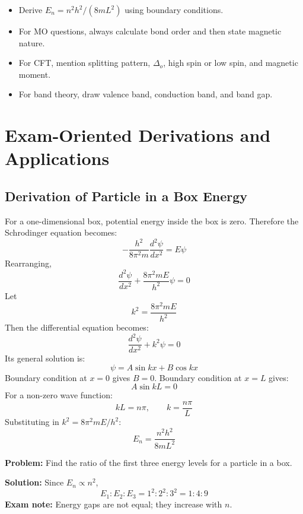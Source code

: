 \documentclass[12pt,a4paper]{article}
\begin{document}
\begin{tcolorbox}[exambox, title={Exam Points}]
\begin{itemize}[leftmargin=*, itemsep=2pt, topsep=2pt]
  \item Derive $E_n=n^2h^2/(8mL^2)$ using boundary conditions.
  \item For MO questions, always calculate bond order and then state magnetic nature.
  \item For CFT, mention splitting pattern, $\Delta_o$, high spin or low spin, and magnetic moment.
  \item For band theory, draw valence band, conduction band, and band gap.
\end{itemize}
\end{tcolorbox}

\section{Exam-Oriented Derivations and Applications}

\subsection{Derivation of Particle in a Box Energy}
For a one-dimensional box, potential energy inside the box is zero. Therefore the Schrodinger equation becomes:
\[
-\frac{h^2}{8\pi^2m}\frac{d^2\psi}{dx^2}=E\psi
\]
Rearranging,
\[
\frac{d^2\psi}{dx^2}+\frac{8\pi^2mE}{h^2}\psi=0
\]
Let
\[
k^2=\frac{8\pi^2mE}{h^2}
\]
Then the differential equation becomes:
\[
\frac{d^2\psi}{dx^2}+k^2\psi=0
\]
Its general solution is:
\[
\psi=A\sin kx+B\cos kx
\]
Boundary condition at $x=0$ gives $B=0$. Boundary condition at $x=L$ gives:
\[
A\sin kL=0
\]
For a non-zero wave function:
\[
kL=n\pi,\qquad k=\frac{n\pi}{L}
\]
Substituting in $k^2=8\pi^2mE/h^2$:
\[
E_n=\frac{n^2h^2}{8mL^2}
\]

\begin{tcolorbox}[examplebox, title={Solved Example: Energy Level Ratio}]
\textbf{Problem:} Find the ratio of the first three energy levels for a particle in a box.

\textbf{Solution:} Since $E_n\propto n^2$,
\[
E_1:E_2:E_3=1^2:2^2:3^2=1:4:9
\]
\textbf{Exam note:} Energy gaps are not equal; they increase with $n$.
\end{tcolorbox}
\end{document}
